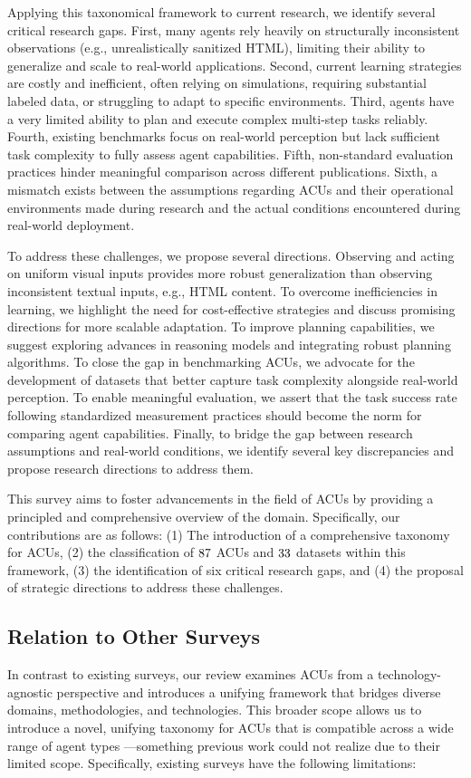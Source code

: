 Applying this taxonomical framework to current research, we identify several critical research gaps.
First, many agents rely heavily on structurally inconsistent observations (e.g., unrealistically sanitized HTML), limiting their ability to generalize and scale to real-world applications.
Second, current learning strategies are costly and inefficient, often relying on simulations, requiring substantial labeled data, or struggling to adapt to specific environments.
Third, agents have a very limited ability to plan and execute complex multi-step tasks reliably.
Fourth, existing benchmarks focus on real-world perception but lack sufficient task complexity to fully assess agent capabilities.
Fifth, non-standard evaluation practices hinder meaningful comparison across different publications.
Sixth, a mismatch exists between the assumptions regarding ACUs and their operational environments made during research and the actual conditions encountered during real-world deployment.

To address these challenges, we propose several directions.
Observing and acting on uniform visual inputs provides more robust generalization than observing inconsistent textual inputs, e.g., HTML content.
To overcome inefficiencies in learning, we highlight the need for cost-effective strategies and discuss promising directions for more scalable adaptation.
To improve planning capabilities, we suggest exploring advances in reasoning models and integrating robust planning algorithms.
To close the gap in benchmarking ACUs, we advocate for the development of datasets that better capture task complexity alongside real-world perception.
To enable meaningful evaluation, we assert that the task success rate following standardized measurement practices should become the norm for comparing agent capabilities.
Finally, to bridge the gap between research assumptions and real-world conditions, we identify several key discrepancies and propose research directions to address them.

This survey aims to foster advancements in the field of ACUs by providing a principled and comprehensive overview of the domain. Specifically, our contributions are as follows: (1) The introduction of a comprehensive taxonomy for ACUs, (2) the classification of $87$ ACUs and $33$ datasets within this framework, (3) the identification of six critical research gaps, and (4) the proposal of strategic directions to address these challenges.


\subsection{Relation to Other Surveys}
In contrast to existing surveys, our review examines ACUs from a technology-agnostic perspective and introduces a unifying framework that bridges diverse domains, methodologies, and technologies.
This broader scope allows us to introduce a novel, unifying taxonomy for ACUs that is compatible across a wide range of agent types ---something previous work could not realize due to their limited scope. Specifically, existing surveys have the following limitations:

